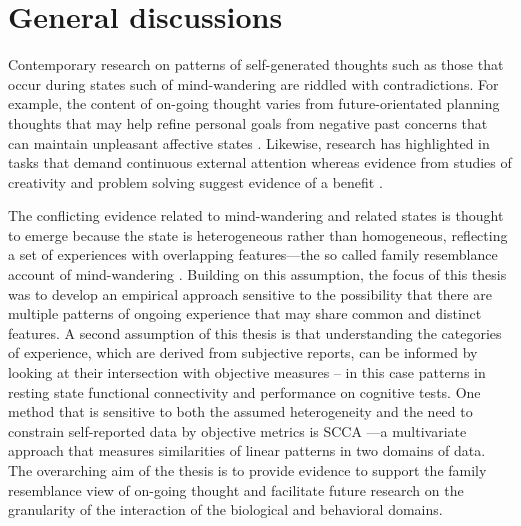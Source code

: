 \chapter{General discussions}
\label{ch:discussion}
Contemporary research on patterns of self-generated thoughts such as those that occur during states such of mind-wandering are riddled with contradictions. For example, the content of on-going thought varies from future-orientated planning thoughts that may help refine personal goals \cite{Medea2016} from negative past concerns that can maintain unpleasant affective states \cite{Killingsworth2010}. Likewise, research has highlighted in tasks that demand continuous external attention \cite{McVayJOEP2009,McVay2012} whereas evidence from studies of creativity and problem solving suggest evidence of a benefit \cite{Smeekens2016,Baird2012}. 

The conflicting evidence related to mind-wandering and related states is thought to emerge because the state is heterogeneous rather than homogeneous, reflecting a set of experiences with overlapping features---the so called family resemblance account of mind-wandering \cite{Smallwood2013, Seli2018}. Building on this assumption, the focus of this thesis was to develop an empirical approach sensitive to the possibility that there are multiple patterns of ongoing experience that may share common and distinct features. A second assumption of this thesis is that understanding the categories of experience, which are derived from subjective reports, can be informed by looking at their intersection with objective measures – in this case patterns in resting state functional connectivity and performance on cognitive tests. One method that is sensitive to both the assumed heterogeneity and the need to constrain self-reported data by objective metrics is SCCA \cite{WittenSCCA2009}---a multivariate approach that measures similarities of linear patterns in two domains of data. The overarching aim of the thesis is to provide evidence to support the family resemblance view of on-going thought and facilitate future research on the granularity of the interaction of the biological and behavioral domains.


